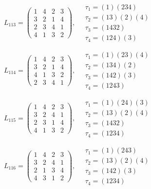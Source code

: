$L_{113} = \begin{pmatrix} 1 & 4 & 2 & 3 \\ 3 & 2 & 1 & 4 \\ 2 & 3 & 4 & 1 \\ 4 & 1 & 3 & 2 \end{pmatrix}, \quad \begin{matrix} \tau_{1} = (1)(2 3 4) \\ \tau_{2} = (1 3)(2)(4) \\ \tau_{3} = (1 4 3 2) \\ \tau_{4} = (1 2 4)(3) \end{matrix}$

$L_{114} = \begin{pmatrix} 1 & 4 & 2 & 3 \\ 3 & 2 & 1 & 4 \\ 4 & 1 & 3 & 2 \\ 2 & 3 & 4 & 1 \end{pmatrix}, \quad \begin{matrix} \tau_{1} = (1)(2 3)(4) \\ \tau_{2} = (1 3 4)(2) \\ \tau_{3} = (1 4 2)(3) \\ \tau_{4} = (1 2 4 3) \end{matrix}$

$L_{115} = \begin{pmatrix} 1 & 4 & 2 & 3 \\ 3 & 2 & 4 & 1 \\ 2 & 3 & 1 & 4 \\ 4 & 1 & 3 & 2 \end{pmatrix}, \quad \begin{matrix} \tau_{1} = (1)(2 4)(3) \\ \tau_{2} = (1 3)(2)(4) \\ \tau_{3} = (1 4 3 2) \\ \tau_{4} = (1 2 3 4) \end{matrix}$

$L_{116} = \begin{pmatrix} 1 & 4 & 2 & 3 \\ 3 & 2 & 4 & 1 \\ 2 & 1 & 3 & 4 \\ 4 & 3 & 1 & 2 \end{pmatrix}, \quad \begin{matrix} \tau_{1} = (1)(2 4 3) \\ \tau_{2} = (1 3)(2)(4) \\ \tau_{3} = (1 4 2)(3) \\ \tau_{4} = (1 2 3 4) \end{matrix}$

